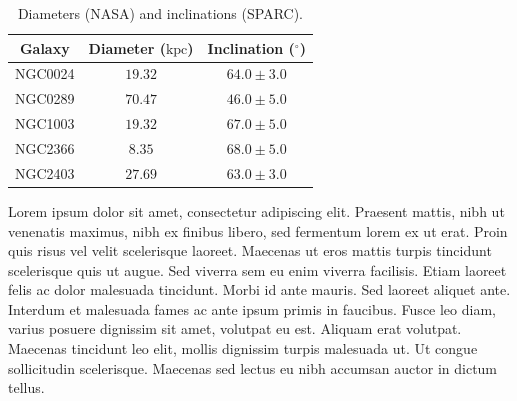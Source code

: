 \documentclass{article}
\newcommand\kpc{\textrm{kpc}}
\begin{document}
\singlespacing %
\begin{table}[h!]
    \centering
    \begin{tabular}{|c|c|c|}
        \hline
        Galaxy & Diameter ($\kpc$) & Inclination ($^\circ$) \\
        \hline
        NGC0024 & $19.32$ & $64.0 \pm 3.0$ \\
        NGC0289 & $70.47$ & $46.0 \pm 5.0$ \\
        NGC1003 & $19.32$ & $67.0 \pm 5.0$ \\
        NGC2366 & $8.35$ & $68.0 \pm 5.0$ \\
        NGC2403 & $27.69$ & $63.0 \pm 3.0$ \\ 
        \hline
    \end{tabular}
    \caption{Diameters (NASA) and inclinations (SPARC).}
    \label{tab:diameters-inclinations}
\end{table}
\doublespacing

Lorem ipsum dolor sit amet, consectetur adipiscing elit. Praesent mattis, nibh ut venenatis maximus, nibh ex finibus libero, sed fermentum lorem ex ut erat. Proin quis risus vel velit scelerisque laoreet. Maecenas ut eros mattis turpis tincidunt scelerisque quis ut augue. Sed viverra sem eu enim viverra facilisis. Etiam laoreet felis ac dolor malesuada tincidunt. Morbi id ante mauris. Sed laoreet aliquet ante. Interdum et malesuada fames ac ante ipsum primis in faucibus. Fusce leo diam, varius posuere dignissim sit amet, volutpat eu est. Aliquam erat volutpat. Maecenas tincidunt leo elit, mollis dignissim turpis malesuada ut. Ut congue sollicitudin scelerisque. Maecenas sed lectus eu nibh accumsan auctor in dictum tellus.

\singlespacing
\end{document}

